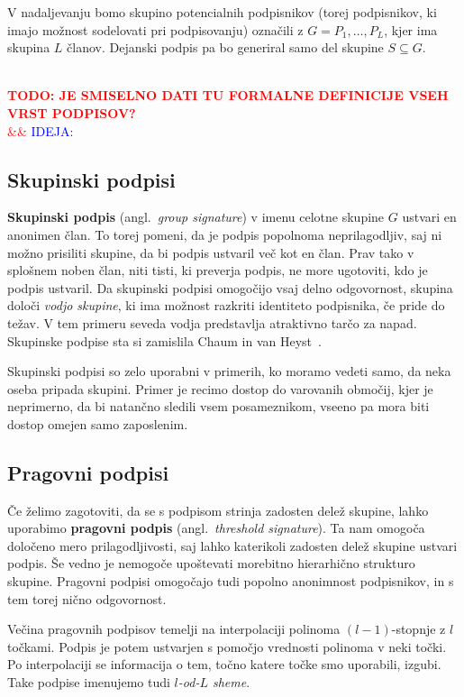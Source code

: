 \documentclass[isrm2, tisk]{fmfdelo}
\newcommand{\todo}[2][]{%
    \textcolor{red}{%
        \\ \textbf{\uppercase{todo: #2}}%
        \\%
        \ifx&#1&%
        \else%
            \textcolor{blue}{\uppercase{ideja:} #1}%
            \\%
        \fi%
    }%
}
\begin{document}
V nadaljevanju bomo skupino potencialnih podpisnikov (torej podpisnikov, ki imajo možnost sodelovati pri 
podpisovanju) označili z $G = P_1, \dots, P_L$, kjer ima skupina $L$ članov. Dejanski podpis pa bo 
generiral samo del skupine $S \subseteq G$.

\todo{je smiselno dati tu formalne definicije vseh vrst podpisov?}

\subsection{Skupinski podpisi}
\textbf{Skupinski podpis} (angl.\ \textit{group signature}) v imenu celotne skupine $G$ ustvari en 
anonimen član. To torej pomeni, da je podpis popolnoma neprilagodljiv, saj ni možno prisiliti skupine,
da bi podpis ustvaril več kot en član. Prav tako v splošnem noben član, niti tisti, ki preverja podpis,
ne more ugotoviti, kdo je podpis ustvaril. Da skupinski podpisi omogočijo vsaj delno odgovornost, 
skupina določi \textit{vodjo skupine}, ki ima možnost razkriti identiteto podpisnika, če pride do 
težav. V tem primeru seveda vodja predstavlja atraktivno tarčo za napad. Skupinske podpise sta si
zamislila Chaum in van Heyst~\cite{chaum1991group}.

\begin{primer}
    Skupinski podpisi so zelo uporabni v primerih, ko moramo vedeti samo, da neka oseba pripada skupini.
    Primer je recimo dostop do varovanih območij, kjer je neprimerno, da bi natančno sledili vsem
    posameznikom, vseeno pa mora biti dostop omejen samo zaposlenim.
\end{primer}

\subsection{Pragovni podpisi}
Če želimo zagotoviti, da se s podpisom strinja zadosten delež skupine, lahko uporabimo \textbf{pragovni 
podpis} (angl.\ \textit{threshold signature}). Ta nam omogoča določeno mero prilagodljivosti, saj lahko 
katerikoli zadosten delež skupine ustvari podpis. Še vedno je nemogoče upoštevati morebitno hierarhično
strukturo skupine. Pragovni podpisi omogočajo tudi popolno anonimnost podpisnikov, in s tem torej 
nično odgovornost. 

Večina pragovnih podpisov temelji na interpolaciji polinoma $(l - 1)$-stopnje z $l$ točkami. Podpis je 
potem ustvarjen s pomočjo vrednosti polinoma v neki točki. Po interpolaciji se informacija o tem, točno 
katere točke smo uporabili, izgubi. Take podpise imenujemo tudi \textit{$l$-od-$L$ sheme}.
\end{document}

